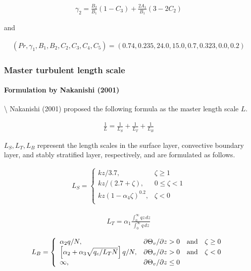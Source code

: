 \begin{eqnarray}\gamma_2=\frac{B_2}{B_1}\left(1-C_3\right)+\frac{2A_1}{B_1}\left(3-2C_2\right)\end{eqnarray}

and

\begin{eqnarray}
(Pr,\gamma_1,B_1,B_2,C_2,C_3,C_4,C_5)=(0.74,0.235,24.0,15.0,0.7,0.323,0.0,0.2)
\end{eqnarray}

\hypertarget{master-turbulent-length-scale}{%
\subsubsection{Master turbulent length
scale}\label{master-turbulent-length-scale}}

\hypertarget{formulation-by-nakanishi-2001}{%
\paragraph{Formulation by Nakanishi
(2001)}\label{formulation-by-nakanishi-2001}}

\textbackslash{} Nakanishi (2001) proposed the following formula as the
master length scale \(L\).

\begin{eqnarray}\frac{1}{L}=\frac{1}{L_S}+\frac{1}{L_T}+\frac{1}{L_B} \tag{p-dif.1} \end{eqnarray}

\(L_S, L_T, L_B\) represent the length scales in the surface layer,
convective boundary layer, and stably stratified layer, respectively,
and are formulated as follows.

\begin{eqnarray}
L_S=\left\{
    \begin{array}{lr}
      kz/3.7, &\zeta\ge 1\\
      kz/(2.7+\zeta), &0\le\zeta< 1\\
      kz(1-\alpha_4\zeta)^{0.2}, &\zeta< 0\\
    \end{array}
  \right.
\end{eqnarray}

\begin{eqnarray}L_T=\alpha_1\frac{\displaystyle \int_0^\infty{qz}\,dz}{\displaystyle \int_0^\infty{q}\,dz}\end{eqnarray}

\begin{eqnarray}
L_B=\left\{
    \begin{array}{ll}
      \alpha_2 q/N, &\partial\Theta_v/\partial z> 0 \quad\rm{and}\quad\zeta\ge 0\\
      \left[\alpha_2+\alpha_3\sqrt{q_c/L_TN}\right]q/N, &\partial\Theta_v/\partial z> 0 \quad\rm{and}\quad\zeta< 0\\
      \infty, &\partial\Theta_v/\partial z\le 0\\
    \end{array}
  \right.
\end{eqnarray}

